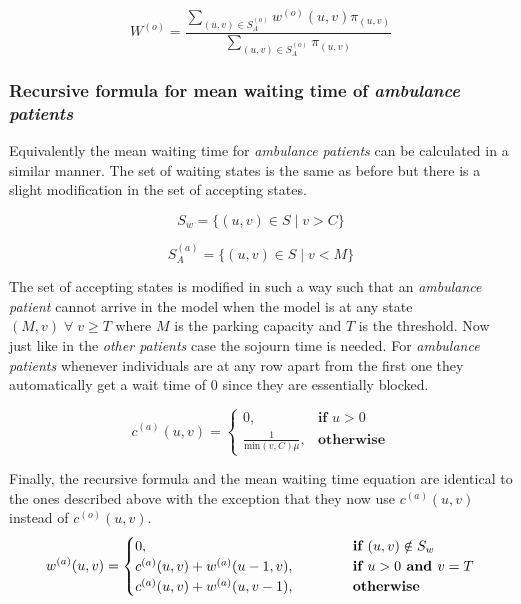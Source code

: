 \begin{equation}
    W^{(o)} = \frac{\sum_{(u,v) \in S_A^{(o)}} w^{(o)}(u,v) \pi_{(u,v)}}{\sum_{(u,v) \in S_A^{(o)}} \pi_{(u,v)}}
\end{equation}



\subsubsection{Recursive formula for mean waiting time of \textit{ambulance patients}}

Equivalently the mean waiting time for \textit{ambulance patients} can be calculated in a similar manner. The set of waiting states is the same as before but there is a slight modification in the set of accepting states.

\[
    S_w = \{(u, v) \in S \; | \; v > C \}    
\]

\[
S_A^{(a)} = \{(u, v) \in S \; | \; v < M \}
\]

The set of accepting states is modified in such a way such that an \textit{ambulance patient} cannot arrive in the model when the model is at any state $(M, v) \; \forall \; v \geq T$ where $M$ is the parking capacity and $T$ is the threshold. Now just like in the \textit{other patients} case the sojourn time is needed. For \textit{ambulance patients} whenever individuals are at any row apart from the first one they automatically get a wait time of \(0\) since they are essentially blocked.

\begin{equation} \label{eq:sojourn_ambulance}
    c^{(a)}(u,v) = 
    \begin{cases}
        0, & \textbf{if } u > 0 \\
        \frac{1}{\text{min}(v,C)\mu}, & \textbf{otherwise}
    \end{cases}
\end{equation}

Finally, the recursive formula and the mean waiting time equation are identical to the ones described above with the exception that they now use \(c^{(a)}(u,v)\) instead of \(c^{(o)}(u,v)\).
\begin{equation}
    w^{(a)}(u,v) = 
    \begin{cases} 
        0, \hspace{4.85cm} & \textbf{if } (u,v) \notin S_w \\
        c^{(a)}(u,v) + w^{(a)}(u-1, v), & \textbf{if } u > 0 \textbf{ and } v = T \\
        c^{(a)}(u,v) + w^{(a)}(u, v-1), & \textbf{otherwise}
    \end{cases}
\end{equation}

